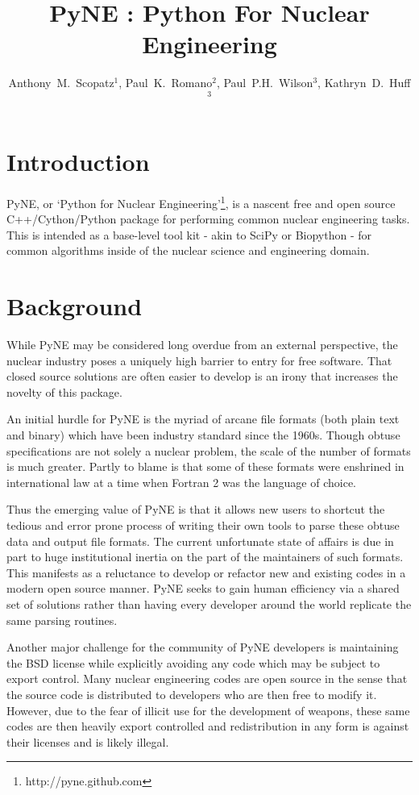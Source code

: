 \documentclass{anstrans}
\title{PyNE : Python For Nuclear Engineering}
\author{Anthony~M.~Scopatz$^1$, Paul~K.~Romano$^2$, Paul~P.H.~Wilson$^3$, Kathryn~D.~Huff$^3$}
\institute{$^1$ University of Chicago, $^2$ Massachusetts Institute of Technology, $^3$ University of Wisconsin }
\date{}
\begin{document}
\section{Introduction}

PyNE, or `Python for Nuclear Engineering'\footnote{http://pyne.github.com}, is a 
nascent free and open source C++/Cython/Python package for performing common 
nuclear engineering tasks.  This is intended as a base-level tool kit - akin to 
SciPy or Biopython - for common algorithms inside of the nuclear science and 
engineering domain. 

\section{Background}

While PyNE may be considered long overdue from an external perspective, the 
nuclear industry poses a uniquely high barrier to entry for free software.  
That closed source solutions are often easier to develop is an irony that 
increases the novelty of this package.

An initial hurdle for PyNE is the myriad of arcane file formats (both plain text
and binary) which have been industry standard since the 1960s.  Though obtuse 
specifications are not solely a nuclear problem, the scale of the number of formats 
is much greater.  Partly to blame is that some of these formats were enshrined 
in international law at a time when Fortran 2 was the language of choice.

Thus the emerging value of PyNE is that it allows new users to shortcut the tedious and 
error prone process of writing their own tools to parse these obtuse data and output file 
formats.  The current unfortunate state of affairs is due in part to huge institutional 
inertia on the part of the maintainers of such formats.  This manifests as a reluctance to 
develop or refactor new and existing codes in a modern open source manner.  PyNE seeks to 
gain human efficiency via a shared set of solutions rather than having every developer 
around the world replicate the same parsing routines.

Another major challenge for the community of PyNE developers is maintaining
the BSD license while explicitly avoiding any code which may be subject to 
export control.  Many nuclear engineering codes are open source in the sense
that the source code is distributed to developers who are then free to modify it.
However, due to the fear of illicit use for the development of weapons, these
same codes are then heavily export controlled and redistribution in any form is 
against their licenses and is likely illegal.
\end{document}

